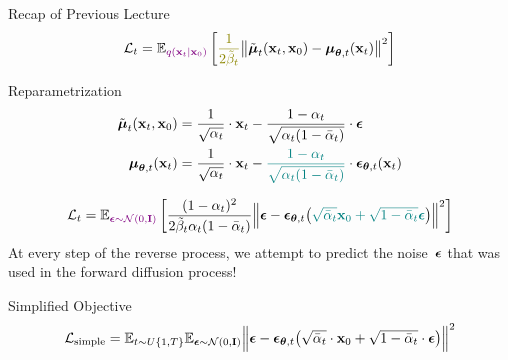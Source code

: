 \documentclass{beamer}
\begin{document}
\begin{frame}{Recap of Previous Lecture}
	\[
		\cL_t = \bbE_{\color{violet}q(\bx_t | \bx_0)} \left[ {\color{olive}\frac{1}{2\tilde{\beta}_t}} \bigl\| \tilde{\bmu}_t(\bx_t, \bx_0) - \bmu_{\btheta, t}(\bx_t) \bigr\|^2  \right]
	\]
	\vspace{-0.3cm}
	\begin{block}{Reparametrization}
		\vspace{-0.7cm}
		\begin{align*}
			\tilde{\boldsymbol{\mu}}_t(\mathbf{x}_t, \mathbf{x}_0) &= \frac{1}{\sqrt{\alpha_t}} \cdot \mathbf{x}_t - \frac{1 - \alpha_t}{\sqrt{\alpha_t (1 - \bar{\alpha}_t)}} \cdot \boldsymbol{\epsilon} \\
			\boldsymbol{\mu}_{\boldsymbol{\theta}, t}(\mathbf{x}_t) &= \frac{1}{\sqrt{\alpha_t}} \cdot \mathbf{x}_t - {\color{teal}\frac{1 - \alpha_t}{\sqrt{\alpha_t (1 - \bar{\alpha}_t)}}} \cdot \boldsymbol{\epsilon}_{\boldsymbol{\theta}, t}(\mathbf{x}_t)
		\end{align*}
		\vspace{-0.7cm}
	\end{block}
	\vspace{-0.2cm}
	\[
		\mathcal{L}_t  =	 \mathbb{E}_{\color{violet}\boldsymbol{\epsilon} \sim \mathcal{N}(0, \mathbf{I})} \left[ \frac{(1 - \alpha_t)^2}{2\tilde{\beta}_t \alpha_t (1 - \bar{\alpha}_t)} \Bigl\| \boldsymbol{\epsilon} - \boldsymbol{\epsilon}_{\boldsymbol{\theta}, t}\bigl( {\color{teal}\sqrt{\bar{\alpha}_t} \mathbf{x}_0 + \sqrt{1 - \bar{\alpha}_t} \boldsymbol{\epsilon}}\bigr) \Bigr\|^2 \right]
	\]
	At every step of the reverse process, we attempt to predict the noise~$\boldsymbol{\epsilon}$ that was used in the forward diffusion process!
	\begin{block}{Simplified Objective}
		\vspace{-0.7cm}
		\[
			 \mathcal{L}_{\text{simple}} = \mathbb{E}_{t \sim U\{1, T\}} \mathbb{E}_{\boldsymbol{\epsilon} \sim \mathcal{N}(0, \mathbf{I})} \Bigl\| \boldsymbol{\epsilon} - \boldsymbol{\epsilon}_{\boldsymbol{\theta}, t}\bigl( \sqrt{\bar{\alpha}_t} \cdot \mathbf{x}_0 + \sqrt{1 - \bar{\alpha}_t} \cdot \boldsymbol{\epsilon}\bigr) \Bigr\|^2
		\]
	\end{block}
\end{frame}
\end{document}

